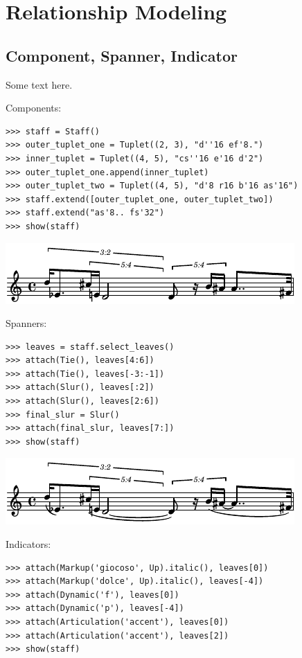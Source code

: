 \section{Relationship Modeling}\label{sec:relationship_modeling}

\subsection{Component, Spanner, Indicator}

Some text here.

Components:

\begin{lstlisting}
>>> staff = Staff()
>>> outer_tuplet_one = Tuplet((2, 3), "d''16 ef'8.")
>>> inner_tuplet = Tuplet((4, 5), "cs''16 e'16 d'2")
>>> outer_tuplet_one.append(inner_tuplet)
>>> outer_tuplet_two = Tuplet((4, 5), "d'8 r16 b'16 as'16")
>>> staff.extend([outer_tuplet_one, outer_tuplet_two])
>>> staff.extend("as'8.. fs'32")
>>> show(staff)
\end{lstlisting}

\includegraphics[scale=1.0]{images/relationship_modeling-1.pdf}


Spanners:

\begin{lstlisting}
>>> leaves = staff.select_leaves()
>>> attach(Tie(), leaves[4:6])
>>> attach(Tie(), leaves[-3:-1])
>>> attach(Slur(), leaves[:2])
>>> attach(Slur(), leaves[2:6])
>>> final_slur = Slur()
>>> attach(final_slur, leaves[7:])
>>> show(staff)
\end{lstlisting}

\includegraphics[scale=1.0]{images/relationship_modeling-2.pdf}


Indicators:

\begin{lstlisting}
>>> attach(Markup('giocoso', Up).italic(), leaves[0])
>>> attach(Markup('dolce', Up).italic(), leaves[-4])
>>> attach(Dynamic('f'), leaves[0])
>>> attach(Dynamic('p'), leaves[-4])
>>> attach(Articulation('accent'), leaves[0])
>>> attach(Articulation('accent'), leaves[2])
>>> show(staff)
\end{lstlisting}

